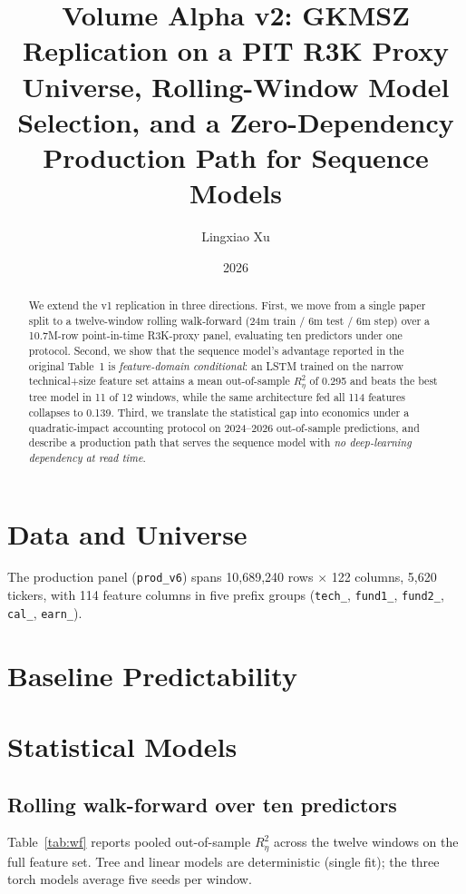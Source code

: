 \documentclass[11pt]{article}
\title{Volume Alpha v2: GKMSZ Replication on a PIT R3K Proxy Universe,
       Rolling-Window Model Selection, and a Zero-Dependency
       Production Path for Sequence Models}
\author{Lingxiao Xu}
\date{2026}
\begin{document}
\maketitle

\begin{abstract}
We extend the v1 replication in three directions. First, we move from a single
paper split to a twelve-window rolling walk-forward (24m train / 6m test / 6m
step) over a 10.7M-row point-in-time R3K-proxy panel, evaluating ten predictors
under one protocol. Second, we show that the sequence model's advantage reported
in the original Table~1 is \emph{feature-domain conditional}: an LSTM trained on
the narrow technical+size feature set attains a mean out-of-sample
$R^2_\eta$ of 0.295 and beats the best tree model in 11 of 12 windows, while the
same architecture fed all 114 features collapses to 0.139. Third, we translate
the statistical gap into economics under a quadratic-impact accounting protocol
on 2024--2026 out-of-sample predictions, and describe a production path that
serves the sequence model with \emph{no deep-learning dependency at read time}.
\end{abstract}

\section{Data and Universe}          %
The production panel (\texttt{prod\_v6}) spans 10,689,240 rows $\times$ 122
columns, 5,620 tickers, with 114 feature columns in five prefix groups
(\texttt{tech\_}, \texttt{fund1\_}, \texttt{fund2\_}, \texttt{cal\_},
\texttt{earn\_}).

\section{Baseline Predictability}    %

\section{Statistical Models}         %

\subsection{Rolling walk-forward over ten predictors}
Table~\ref{tab:wf} reports pooled out-of-sample $R^2_\eta$ across the twelve
windows on the full feature set. Tree and linear models are deterministic
(single fit); the three torch models average five seeds per window.
\end{document}

